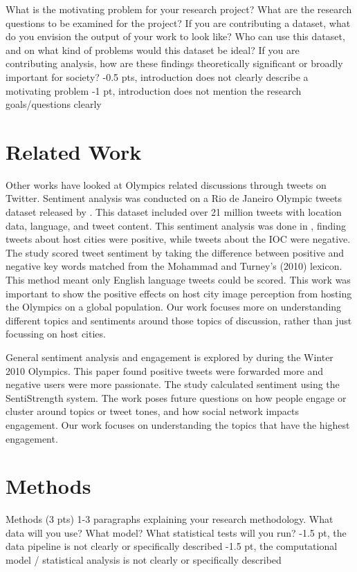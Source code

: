 \documentclass[letterpaper]{article} %
\begin{document}
What is the motivating problem for your research project? What are the research questions to be examined for the project? If you are contributing a dataset, what do you envision the output of your work to look like? Who can use this dataset, and on what kind of problems would this dataset be ideal? If you are contributing analysis, how are these findings theoretically significant or broadly important for society?
-0.5 pts, introduction does not clearly describe a motivating problem
-1 pt, introduction does not mention the research goals/questions clearly

\section{Related Work}
Other works have looked at Olympics related discussions through tweets on Twitter. Sentiment analysis was conducted on a Rio de Janeiro Olympic tweets dataset released by \cite{VERTALKA2019103869}. This dataset included over 21 million tweets with location data, language, and tweet content. This sentiment analysis was done in \cite{KASSENSNOOR2019229}, finding tweets about host cities were positive, while tweets about the IOC were negative. The study scored tweet sentiment by taking the difference between positive and negative key words matched from the Mohammad and Turney's (2010) lexicon. This method meant only English language tweets could be scored. This work was important to show the positive effects on host city image perception from hosting the Olympics on a global population. Our work focuses more on understanding different topics and sentiments around those topics of discussion, rather than just focussing on host cities. 

General sentiment analysis and engagement is explored by \cite{5718715} during the Winter 2010 Olympics. This paper found positive tweets were forwarded more and negative users were more passionate. The study calculated sentiment using the SentiStrength system. The work poses future questions on how people engage or cluster around topics or tweet tones, and how social network impacts engagement. Our work focuses on understanding the topics that have the highest engagement. 


\section{Methods}
Methods (3 pts)
1-3 paragraphs explaining your research methodology. What data will you use? What model? What statistical tests will you run?
-1.5 pt, the data pipeline is not clearly or specifically described 
-1.5 pt, the computational model / statistical analysis is not clearly or specifically described 
\end{document}
